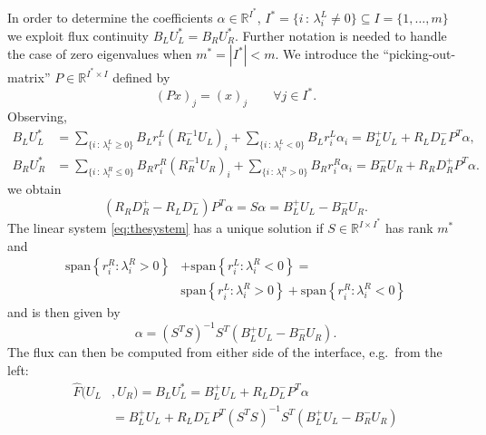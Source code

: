 \documentclass[a4paper,12pt]{article}
\theoremstyle{definition}
\theoremstyle{definition}
\begin{document}
In order to determine the coefficients $\alpha\in\mathbb{R}^{I^\ast}$, 
$I^\ast = \{i \,:\, \lambda_i^L\neq 0\}\subseteq I = \{1,\ldots,m\}$ 
we exploit flux continuity $B_L U_L^\ast = B_R U_R^\ast$. Further notation is needed to handle
the case of zero eigenvalues when $m^\ast=|I^\ast|<m$. 
We introduce the ``picking-out-matrix'' $P \in \mathbb{R}^{I^\ast\times I}$
defined by $$(P x)_j = (x)_j \qquad\forall j\in I^\ast .$$
Observing,
\begin{align*}
B_L U_L^\ast &= \sum_{\{i \,:\, \lambda_i^L\geq 0\}} B_L r_i^L (R_L^{-1} U_L)_i + \sum_{\{i \,:\, \lambda_i^L<0\}} B_L r_i^L \alpha_i
= B_L^+ U_L + R_L D_L^- P^T \alpha,\\
B_R U_R^\ast &= \sum_{\{i \,:\, \lambda_i^R\leq 0\}} B_R r_i^R (R_R^{-1} U_R)_i + \sum_{\{i \,:\, \lambda_i^R>0\}} B_R r_i^R \alpha_i
= B_R^- U_R + R_R D_R^+ P^T \alpha .
\end{align*}
we obtain 
\begin{equation}\label{eq:thesystem}
(R_R D_R^+ - R_L D_L^-) P^T \alpha = S \alpha =  B_L^+ U_L - B_R^- U_R .
\end{equation}
The linear system \eqref{eq:thesystem} has a unique solution if
$S\in\mathbb{R}^{I\times I^\ast}$ has rank $m^\ast$ and
\begin{equation}
\begin{split}
\text{span}\left\{r_i^R:\lambda_i^R>0\right\} &+ \text{span}\left\{r_i^L:\lambda_i^R<0\right\} = \\
&\text{span}\left\{r_i^L:\lambda_i^R>0\right\} + \text{span}\left\{r_i^R:\lambda_i^R<0\right\}
\end{split}
\end{equation}
and is then given by
\begin{equation}
\alpha = \left( S^T S \right)^{-1} S^T \left( B_L^+ U_L - B_R^- U_R \right) .
\end{equation}
The flux can then be computed from either side of the interface, e.g.~from the left:
\begin{equation}
\begin{split}
\hat F(U_L&,U_R) = B_L U_L^\ast = B_L^+ U_L + R_L D_L^- P^T \alpha\\
&= B_L^+ U_L + R_L D_L^- P^T \left( S^T S \right)^{-1} S^T \left( B_L^+ U_L - B_R^- U_R \right)
\end{split}
\end{equation}
\end{document}

